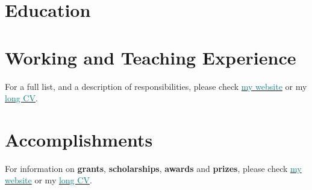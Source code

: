 \documentclass[11pt, a4paper]{awesome-cv}
\begin{document}
\hypertarget{education}{%
\section{Education}\label{education}}

\begin{cventries}
\end{cventries}

\hypertarget{working-and-teaching-experience}{%
\section{Working and Teaching
Experience}\label{working-and-teaching-experience}}

For a full list, and a description of responsibilities, please check
\href{https://jdleongomez.info/en/\#experience}{\textcolor{teal}{my website}}
or my
\href{https://jdleongomez.info/en/files/jdl_cv_en.pdf}{\textcolor{teal}{long CV}}.

\begin{cventries}
\end{cventries}

\hypertarget{accomplishments}{%
\section{Accomplishments}\label{accomplishments}}

For information on \textbf{grants}, \textbf{scholarships},
\textbf{awards} and \textbf{prizes}, please check
\href{https://jdleongomez.info/en/\#accomplishments}{\textcolor{teal}{my website}}
or my
\href{https://jdleongomez.info/en/files/jdl_cv_en.pdf}{\textcolor{teal}{long CV}}.
\end{document}
